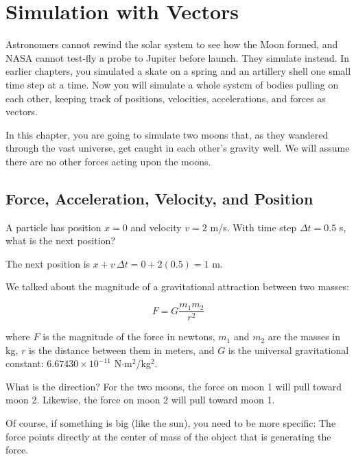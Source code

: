\chapter{Simulation with Vectors}

Astronomers cannot rewind the solar system to see how the Moon formed,
and NASA cannot test-fly a probe to Jupiter before launch. They simulate
instead. In earlier chapters, you simulated a skate on a spring and an
artillery shell one small time step at a time. Now you will simulate a
whole system of bodies pulling on each other, keeping track of positions,
velocities, accelerations, and forces as vectors.

In this chapter, you are going to simulate two moons that, as they wandered through the vast universe,  get caught
in each other's gravity well.   We will assume there are no other forces acting upon the moons.

\section{Force, Acceleration, Velocity, and Position}

\begin{Worked}
\begin{Problem}
A particle has position $x = 0$ and velocity $v = 2$ m/s. With time step $\Delta t = 0.5$ s, what is the next position?
\end{Problem}
\begin{Solution}
The next position is $x + v\,\Delta t = 0 + 2(0.5) = 1$ m.
\end{Solution}
\end{Worked}

We talked about the magnitude of a gravitational attraction between two masses:

$$F = G\frac{m_1 m_2}{r^2}$$

where $F$ is the magnitude of the force in newtons, $m_1$ and $m_2$ are the masses in kg,  $r$ is the distance between them in meters, and $G$ is the universal gravitational constant: $6.67430 \times 10^{-11}$ N$\cdot$m$^2$/kg$^2$.

What is the direction?  For the two moons,  the force on moon 1 will pull toward moon 2.  
Likewise, the force on moon 2 will pull toward moon 1.
 
Of course,  if something is big (like the sun),  you need to be more specific:  The force points directly at the center
of mass of the object that is generating the force.

